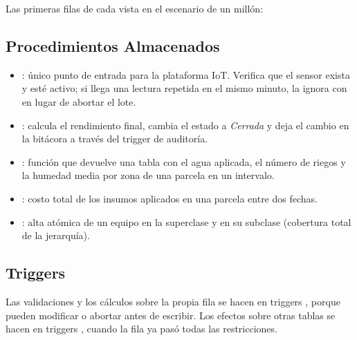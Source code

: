 
Las primeras filas de cada vista en el escenario de un millón:


\subsection{Procedimientos Almacenados}

\begin{itemize}[leftmargin=1.4em,itemsep=0.1em]
\item {}: único punto de entrada para la plataforma IoT. Verifica que el sensor exista y esté activo; si llega una lectura repetida en el mismo minuto, la ignora con  en lugar de abortar el lote.
\item {}: calcula el rendimiento final, cambia el estado a \emph{Cerrada} y deja el cambio en la bitácora a través del trigger de auditoría.
\item {}: función que devuelve una tabla con el agua aplicada, el número de riegos y la humedad media por zona de una parcela en un intervalo.
\item {}: costo total de los insumos aplicados en una parcela entre dos fechas.
\item {}: alta atómica de un equipo en la superclase y en su subclase (cobertura total de la jerarquía).
\end{itemize}



\subsection{Triggers}

Las validaciones y los cálculos sobre la propia fila se hacen en triggers , porque pueden modificar  o abortar antes de escribir. Los efectos sobre otras tablas se hacen en triggers , cuando la fila ya pasó todas las restricciones.

